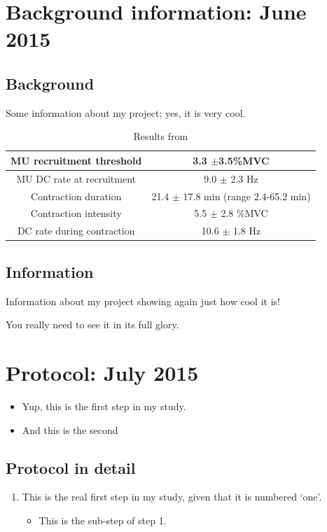 \section{Background information: June 2015}
\subsection{Background} 
Some information about my project; yes, it is very cool.

\begin{table}[!htbp]
\caption{Results from \cite{Pascoe2014}}
\begin{tabular}{|c|c|}
\hline 
MU recruitment threshold & 3.3 $\pm$3.5\%MVC \\ 
\hline 
MU DC rate at recruitment & 9.0 $\pm$ 2.3 Hz \\ 
\hline 
Contraction duration & 21.4 $\pm$ 17.8 min (range 2.4-65.2 min) \\ 
\hline 
Contraction intensity & 5.5 $\pm$ 2.8 \%MVC \\ 
\hline 
DC rate during contraction & 10.6 $\pm$ 1.8 Hz \\ 
\hline 
\end{tabular} 
\end{table}

\subsection{Information} 
Information about my project showing again just how cool it is!

You really need to see it in its full glory. \lipsum[1]

\section{Protocol: July 2015}
\begin{itemize}
	\item Yup, this is the first step in my study.
	\item And this is the second
\end{itemize} 

\subsection{Protocol in detail}
\begin{enumerate}
	\item This is the real first step in my study, given that it is numbered `one'.
	\begin{itemize}
		\item This is the sub-step of step 1.
	\end{itemize}
\end{enumerate}

